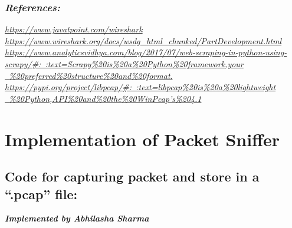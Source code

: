 \documentclass[12pt, a4paper]{report}
\begin{document}
\subsection{\emph{References:}}
\begin{flushleft}
\href{https://www.javatpoint.com/wireshark}{\emph{https://www.javatpoint.com/wireshark}}
\bigbreak
\href{https://www.wireshark.org/docs/wsdg_html_chunked/PartDevelopment.html}{\emph{https://www.wireshark.org/docs/wsdg\_html\_chunked/PartDevelopment.html}}
\bigbreak
\href{https://www.analyticsvidhya.com/blog/2017/07/web-scraping-in-python-using-scrapy/\#:~:text=Scrapy\%20is\%20a\%20Python\%20framework,your\%20preferred\%20structure\%20and\%20format}{\emph{https://www.analyticsvidhya.com/blog/2017/07/web-scraping-in-python-using-scrapy/\#:~:text=Scrapy\%20is\%20a\%20Python\%20framework,your \ \%20preferred\%20structure\%20and\%20format}.}
\bigbreak
\href{https://pypi.org/project/libpcap/\#:~:text=libpcap\%20is\%20a\%20lightweight\%20Python,API\%20and\%20the\%20WinPcap's\%204.1}{\emph{https://pypi.org/project/libpcap/\#:~:text=libpcap\%20is\%20a\%20lightweight \ \%20Python,API\%20and\%20the\%20WinPcap's\%204.1}}
\end{flushleft}
\newpage
\chapter{Implementation of Packet Sniffer}

\section{Code for capturing packet  and store in a “.pcap” file:}
\emph{\large \textbf{Implemented by Abhilasha Sharma\\}}
\end{document}

